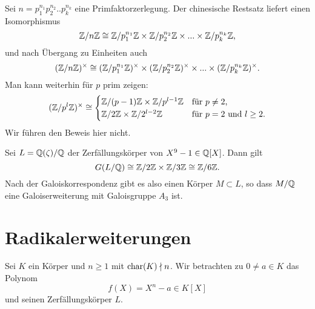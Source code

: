 \documentclass{book}
\begin{document}
\begin{rem}
    \label{rem:rest}
    Sei $n = p_1^{n_1} p_2^{n_2} .. p_k^{n_k}$ eine Primfaktorzerlegung. Der chinesische Restsatz liefert einen Isomorphismus 
    \[
        \mathbb{Z}/n\mathbb{Z} \cong \mathbb{Z}/p_1^{n_1}\mathbb{Z} \times \mathbb{Z}/p_2^{n_2}\mathbb{Z} \times ... \times  \mathbb{Z}/p_k^{n_k}\mathbb{Z},
    \]
    und nach Übergang zu Einheiten auch 
    \[
        (\mathbb{Z}/n\mathbb{Z})^{\times} \cong (\mathbb{Z}/p_1^{n_1}\mathbb{Z})^{\times} \times (\mathbb{Z}/p_2^{n_2}\mathbb{Z})^{\times} \times ... \times  (\mathbb{Z}/p_k^{n_k}\mathbb{Z})^{\times}.
    \]
    Man kann weiterhin für $p$ prim zeigen:
    \[
        (\mathbb{Z}/p^l\mathbb{Z})^{\times} \cong \begin{cases} \mathbb{Z}/(p-1)\mathbb{Z} \times \mathbb{Z}/p^{l-1}\mathbb{Z} & \text{für $p \ne 2$,}\\
        \mathbb{Z}/2\mathbb{Z} \times \mathbb{Z}/2^{l-2}\mathbb{Z} & \text{für $p = 2$ und $l \ge 2$.} \end{cases}
    \]
    Wir führen den Beweis hier nicht. 
\end{rem}

\begin{exa}
    \label{exa:kreis}
    Sei $L = \mathbb{Q}(\zeta)/\mathbb{Q}$ der Zerfällungskörper von $X^9 -1 \in \mathbb{Q}[X]$. Dann gilt
    \[
        G(L/\mathbb{Q}) \cong \mathbb{Z}/2\mathbb{Z} \times \mathbb{Z}/3\mathbb{Z} \cong \mathbb{Z}/6\mathbb{Z}.
    \]
    Nach der Galoiskorrespondenz gibt es also einen Körper $M \subset L$, so
    dass $M/\mathbb{Q}$ eine Galoiserweiterung mit Galoisgruppe $A_3$ ist. 
\end{exa}

\section{Radikalerweiterungen}%
\label{sec:radikalpolynome}


Sei $K$ ein Körper und $n \ge 1$ mit $\operatorname{char}(K) \nmid n$. Wir betrachten zu $0
\ne a \in K$ das Polynom
\[
    f(X) = X^n - a \in K[X]
\]
und seinen Zerfällungskörper $L$. 
\end{document}
